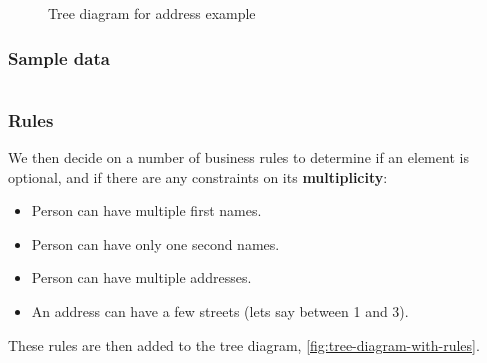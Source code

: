 \documentclass{pgnotes}
\begin{document}
\begin{figure}[htbp]
  \centering
  \caption{Tree diagram for address example}
  \label{fig:tree-diagram}
\end{figure}

\subsubsection{Sample data}

\inputminted{xml}{sampledata.xml}

\subsubsection{Rules}

We then decide on a number of business rules to determine if an element is optional, and if there are any constraints on its \textbf{multiplicity}: 

\begin{itemize}
\item Person can have multiple first names.
\item Person can have only one second names.
\item Person can have multiple addresses.
\item An address can have a few streets (lets say between 1 and 3).
\end{itemize}

These rules are then added to the tree diagram, \autoref{fig:tree-diagram-with-rules}. 
\end{document}
